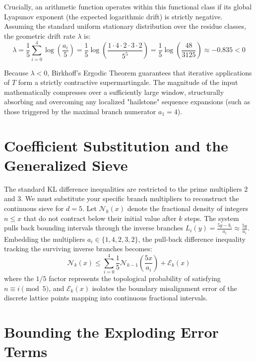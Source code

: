 Crucially, an arithmetic function operates within this functional class if its global Lyapunov exponent (the expected logarithmic drift) is strictly negative. Assuming the standard uniform stationary distribution over the residue classes, the geometric drift rate $\lambda$ is:
$$ \lambda = \frac{1}{5} \sum_{i=0}^{4} \log\left(\frac{a_i}{5}\right) = \frac{1}{5} \log\left(\frac{1 \cdot 4 \cdot 2 \cdot 3 \cdot 2}{5^5}\right) = \frac{1}{5} \log\left(\frac{48}{3125}\right) \approx -0.835 < 0 $$

Because $\lambda < 0$, Birkhoff's Ergodic Theorem guarantees that iterative applications of $T$ form a strictly contractive supermartingale. The magnitude of the input mathematically compresses over a sufficiently large window, structurally absorbing and overcoming any localized "hailstone" sequence expansions (such as those triggered by the maximal branch numerator $a_1=4$).

\section{Coefficient Substitution and the Generalized Sieve}

The standard KL difference inequalities are restricted to the prime multipliers $2$ and $3$. We must substitute your specific branch multipliers to reconstruct the continuous sieve for $d=5$. Let $\mathcal{N}_k(x)$ denote the fractional density of integers $n \le x$ that do not contract below their initial value after $k$ steps. The system pulls back bounding intervals through the inverse branches $L_i(y) = \frac{5y - b_i}{a_i} \approx \frac{5y}{a_i}$. Embedding the multipliers $a_i \in \{1, 4, 2, 3, 2\}$, the pull-back difference inequality tracking the surviving inverse branches becomes:
$$ \mathcal{N}_k(x) \le \sum_{i=0}^{4} \frac{1}{5} \mathcal{N}_{k-1}\left( \frac{5x}{a_i} \right) + \mathcal{E}_k(x) $$
where the $1/5$ factor represents the topological probability of satisfying $n \equiv i \pmod 5$, and $\mathcal{E}_k(x)$ isolates the boundary misalignment error of the discrete lattice points mapping into continuous fractional intervals.

\section{Bounding the Exploding Error Terms}


